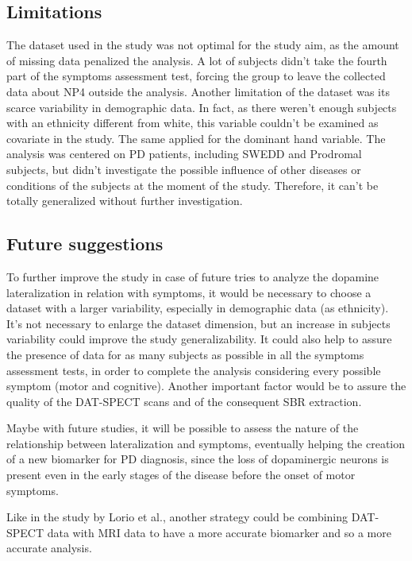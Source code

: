 \documentclass[]{article}
\begin{document}
\begin{multicols}{2}
\subsection{Limitations}

The dataset used in the study was not optimal for the study aim, as the amount of missing data penalized the analysis. A lot of subjects didn't take the fourth part of the symptoms assessment test, forcing the group to leave the collected data about NP4 outside the analysis. 
Another limitation of the dataset was its scarce variability in demographic data. In fact, as there weren't enough subjects with an ethnicity different from white, this variable couldn't be examined as covariate in the study. The same applied for the dominant hand variable. 
The analysis was centered on PD patients, including SWEDD and Prodromal subjects, but didn't investigate the possible influence of other diseases or conditions of the subjects at the moment of the study. Therefore, it can't be totally generalized without further investigation. 

\subsection{Future suggestions}

To further improve the study in case of future tries to analyze the dopamine lateralization in relation with symptoms, it would be necessary to choose a dataset with a larger variability, especially in demographic data (as ethnicity). It's not necessary to enlarge the dataset dimension, but an increase in subjects variability could improve the study generalizability.
It could also help to assure the presence of data for as many subjects as possible in all the symptoms assessment tests, in order to complete the analysis considering every possible symptom (motor and cognitive). 
Another important factor would be to assure the quality of the DAT-SPECT scans and of the consequent SBR extraction. 

Maybe with future studies, it will be possible to assess the nature of the relationship between lateralization and symptoms, eventually helping the creation of a new biomarker for PD diagnosis, since the loss of dopaminergic neurons is present even in the early stages of the disease before the onset of motor symptoms. \cite{booij_spect_2007}

Like in the study \cite{lorio_combination_2019} by Lorio et al., another strategy could be combining DAT-SPECT data with MRI data to have a more accurate biomarker and so a more accurate analysis.


\end{multicols}

\printbibliography
\end{document}
